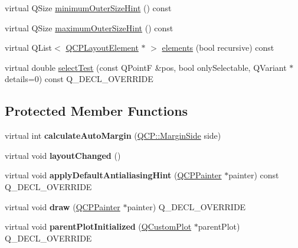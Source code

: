 \begin{DoxyCompactItemize}
\item 
virtual Q\+Size \hyperlink{classQCPLayoutElement_a46789036c4fcb190fa374f91321d7c09}{minimum\+Outer\+Size\+Hint} () const
\item 
virtual Q\+Size \hyperlink{classQCPLayoutElement_ad96efb977a26e360e8a64a4c1e56456d}{maximum\+Outer\+Size\+Hint} () const
\item 
virtual Q\+List$<$ \hyperlink{classQCPLayoutElement}{Q\+C\+P\+Layout\+Element} $\ast$ $>$ \hyperlink{classQCPLayoutElement_a76dec8cb31e498994a944d7647a43309}{elements} (bool recursive) const
\item 
virtual double \hyperlink{classQCPLayoutElement_ae97f483cccedadbf18ea4525ef240ee4}{select\+Test} (const Q\+PointF \&pos, bool only\+Selectable, Q\+Variant $\ast$details=0) const Q\+\_\+\+D\+E\+C\+L\+\_\+\+O\+V\+E\+R\+R\+I\+DE
\end{DoxyCompactItemize}
\subsection*{Protected Member Functions}
\begin{DoxyCompactItemize}
\item 
\mbox{\label{classQCPLayoutElement_a005c9f0fe84bc1591a2cf2c46fd477b4}} 
virtual int {\bfseries calculate\+Auto\+Margin} (\hyperlink{namespaceQCP_a7e487e3e2ccb62ab7771065bab7cae54}{Q\+C\+P\+::\+Margin\+Side} side)
\item 
\mbox{\label{classQCPLayoutElement_a765f041a73af0c2de41b41a5a03e31a4}} 
virtual void {\bfseries layout\+Changed} ()
\item 
\mbox{\label{classQCPLayoutElement_a0a8f18141bcf46cf40ad4c13324ff346}} 
virtual void {\bfseries apply\+Default\+Antialiasing\+Hint} (\hyperlink{classQCPPainter}{Q\+C\+P\+Painter} $\ast$painter) const Q\+\_\+\+D\+E\+C\+L\+\_\+\+O\+V\+E\+R\+R\+I\+DE
\item 
\mbox{\label{classQCPLayoutElement_ad1c597b1d608cfdd86e7b76819a94cfb}} 
virtual void {\bfseries draw} (\hyperlink{classQCPPainter}{Q\+C\+P\+Painter} $\ast$painter) Q\+\_\+\+D\+E\+C\+L\+\_\+\+O\+V\+E\+R\+R\+I\+DE
\item 
\mbox{\label{classQCPLayoutElement_ab4bb5c5a958451f5f153fdce350f13cf}} 
virtual void {\bfseries parent\+Plot\+Initialized} (\hyperlink{classQCustomPlot}{Q\+Custom\+Plot} $\ast$parent\+Plot) Q\+\_\+\+D\+E\+C\+L\+\_\+\+O\+V\+E\+R\+R\+I\+DE
\end{DoxyCompactItemize}
